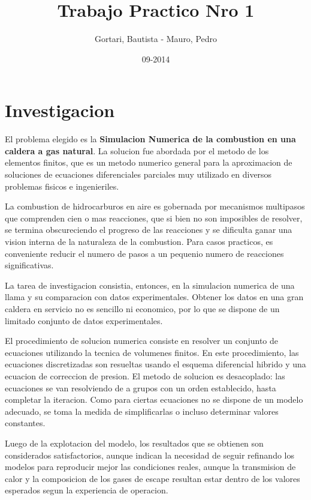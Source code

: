 \documentclass{article}
\title{Trabajo Practico Nro 1}
\date{09-2014}
\author{Gortari, Bautista - Mauro, Pedro}
\begin{document}
\maketitle
\newpage
\tableofcontents
\newpage
{}

\section{Investigacion}
El problema elegido es la \textbf{Simulacion Numerica de la combustion en una
caldera a gas natural}. La solucion fue abordada por el metodo de los
elementos finitos, que es un metodo numerico general para la
aproximacion de soluciones de ecuaciones diferenciales parciales muy
utilizado en diversos problemas fisicos e ingenieriles.

La combustion de hidrocarburos en aire es gobernada por mecanismos
multipasos que comprenden cien o mas reacciones, que si bien no son
imposibles de resolver, se termina obscureciendo el progreso de las
reacciones y se dificulta ganar una vision interna de la naturaleza de
la combustion. Para casos practicos, es conveniente reducir el numero
de pasos a un pequenio numero de reacciones significativas.

La tarea de investigacion consistia, entonces, en la simulacion numerica de una
llama y su comparacion con datos experimentales. Obtener los datos en
una gran caldera en servicio no es sencillo ni economico, por lo que
se dispone de un limitado conjunto de datos experimentales. 

El procedimiento de solucion numerica consiste en resolver un conjunto
de ecuaciones utilizando la tecnica de volumenes finitos. En este
procedimiento, las ecuaciones discretizadas son resueltas usando el
esquema diferencial hibrido y una ecuacion de correccion de presion.
El metodo de solucion es desacoplado: las ecuaciones se van
resolviendo de a grupos con un orden establecido, hasta completar la iteracion.
Como para ciertas ecuaciones no se dispone de un modelo adecuado, se
toma la medida de simplificarlas o incluso determinar valores
constantes.

Luego de la explotacion del modelo, los resultados que se obtienen son
considerados satisfactorios, aunque indican la necesidad de seguir refinando los modelos para reproducir
mejor las condiciones reales, aunque la transmision de calor y la composicion
de los gases de escape resultan estar dentro de los valores esperados segun la
experiencia de operacion.
\end{document}
